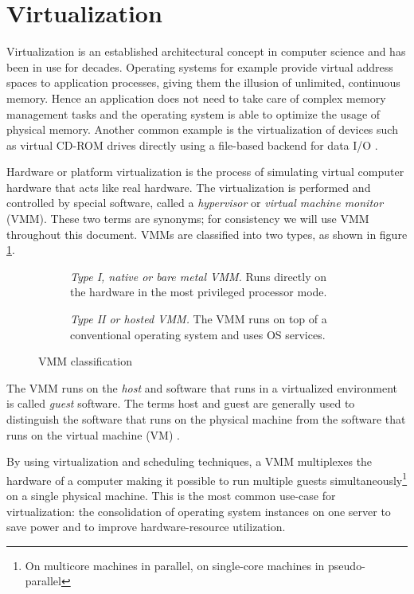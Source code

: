 \section{Virtualization}
Virtualization is an established architectural concept in computer science and
has been in use for decades. Operating systems for example provide virtual
address spaces to application processes, giving them the illusion of unlimited,
continuous memory. Hence an application does not need to take care of complex
memory management tasks and the operating system is able to optimize the usage
of physical memory. Another common example is the virtualization of devices such
as virtual CD-ROM drives directly using a file-based backend for data I/O
\cite{CryptoCloud}.

Hardware or platform virtualization is the process of simulating virtual
computer hardware that acts like real hardware. The virtualization is performed
and controlled by special software, called a
\emph{hypervisor} or \emph{virtual machine monitor}
(VMM). These two terms are synonyms; for consistency we will use VMM
throughout this document. VMMs are classified into two types, as shown in figure
\ref{fig:vmm-classification}.

\begin{figure}[h!]
	\centering
	\begin{subfigure}[b]{0.24\textwidth}
		\centering
		
		\caption{\emph{Type I, native or bare metal VMM.} Runs directly on the
		hardware in the most privileged processor mode.}
	\end{subfigure}
	\qquad
	\begin{subfigure}[b]{0.24\textwidth}
		\centering
		
		\caption{\emph{Type II or hosted VMM.} The VMM runs on top of a
		conventional operating system and uses OS services.}
	\end{subfigure}
	\caption{VMM classification}
	\label{fig:vmm-classification}
\end{figure}

The VMM runs on the \emph{host} and software that runs in a virtualized
environment is called \emph{guest} software. The terms host and guest are
generally used to distinguish the software that runs on the physical machine
from the software that runs on the virtual machine (VM)
\cite{wiki:virtualization}.

By using virtualization and scheduling techniques, a VMM multiplexes the
hardware of a computer making it possible to run multiple guests
simultaneously\footnote{On multicore machines in parallel, on single-core
machines in pseudo-parallel} on a single physical machine. This is the most
common use-case for virtualization: the consolidation of operating system
instances on one server to save power and to improve hardware-resource
utilization.

